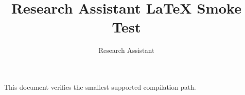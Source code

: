 \documentclass{article}
\title{Research Assistant LaTeX Smoke Test}
\author{Research Assistant}
\begin{document}
\maketitle

This document verifies the smallest supported compilation path.
\end{document}

